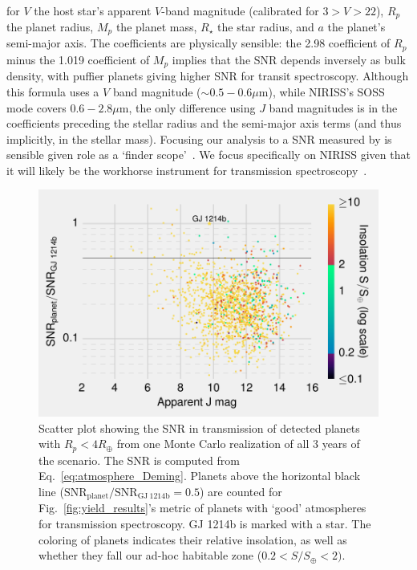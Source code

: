 \begin{enumerate}
\begin{align*}
	\end{align*}
	for $V$ the host star's apparent $V$-band magnitude (calibrated for $3>V>22$), $R_p$ the planet radius, $M_p$ the planet mass, $R_\star$ the star radius, and $a$ the planet's semi-major axis.
	The coefficients are physically sensible: the 2.98 coefficient of $R_p$ minus the 1.019 coefficient of $M_p$ implies that the SNR depends inversely as bulk density, with puffier planets giving higher SNR for transit spectroscopy.
	Although this formula uses a $V$ band magnitude ($\sim 0.5-0.6\mu\mathrm{m}$), while NIRISS's SOSS mode covers $0.6-2.8\mu\mathrm{m}$, the only difference using $J$ band magnitudes is in the coefficients preceding the stellar radius and the semi-major axis terms (and thus implicitly, in the stellar mass).
	Focusing our analysis to a SNR measured by \jwst is sensible given \tesss role as a `\jwst finder scope'~\citep{deming_jwst_tess_2009}.
	We focus specifically on NIRISS given that it will likely be the workhorse \jwst instrument for transmission spectroscopy~\citep{beichman_observations_2014}.
	\begin{figure}[!th]
		\centering
		\includegraphics[]{figures/SNR_in_transmission.pdf}
		\caption{ Scatter plot showing the SNR in transmission of detected planets with $R_p<4R_\oplus$ from one Monte Carlo realization of all 3 years of the \npole\:scenario.
			The SNR is computed from Eq.~\protect\ref{eq:atmosphere_Deming}.
			Planets above the horizontal black line ($\mathrm{SNR_{planet}/SNR_{GJ\ 1214b}} = 0.5$) are counted for Fig.~\protect\ref{fig:yield_results}'s metric of planets with `good' atmospheres for transmission spectroscopy.
			GJ 1214b is marked with a star.
			The coloring of planets indicates their relative insolation, as well as whether they fall our ad-hoc habitable zone ($0.2<S/S_\oplus<2)$.
		}
		\label{fig:atmosphere_scatter}
	\end{figure}


\end{enumerate}
